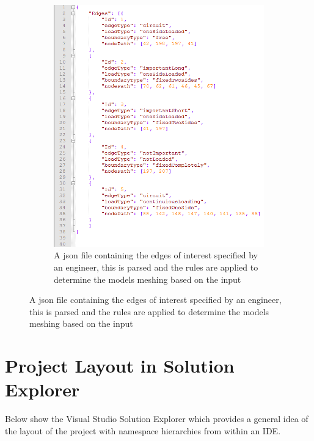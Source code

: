 \begin{figure}[h!!]
\begin{subfigure}{.5\textwidth}
  \includegraphics[width=0.8\linewidth]{../Graphics/jsonEdgeFileLayout.png}
  \caption{A json file containing the edges of interest specified by an engineer, this is parsed and the rules are applied to determine the models meshing based on the input}
  \label{fig:sub2}
\end{subfigure}
\label{fig:test}
\end{figure}


\section{Project Layout in Solution Explorer}
Below show the Visual Studio Solution Explorer which provides a general idea of the layout of the project with namespace hierarchies from within an IDE.

